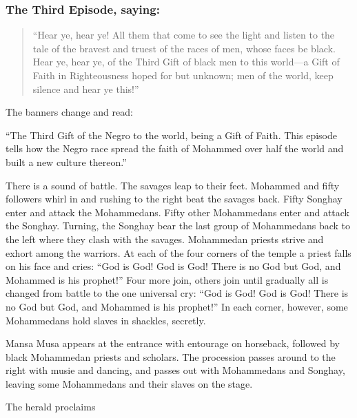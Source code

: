 \documentclass[letterpaper,10pt,english]{jupyterBook}
\begin{document}
\subsubsection{The Third Episode, saying:}
\label{\detokenize{Volumes/06/07/national_emancipation_exposition:the-third-episode-saying}}\begin{quote}

\sphinxAtStartPar
“Hear ye, hear ye! All them that come to see the light and listen to the tale of the bravest and truest of the races of men, whose faces be black. Hear ye, hear ye, of the Third Gift of black men to this world—a Gift of Faith in Righteousness hoped for but unknown; men of the world, keep silence and hear ye this!”
\end{quote}

\sphinxAtStartPar
The banners change and read:

\sphinxAtStartPar
“The Third Gift of the Negro to the world, being a Gift of Faith. This episode tells how the Negro race spread the faith of Mohammed over half the world and built a new culture thereon.”

\sphinxAtStartPar
There is a sound of battle. The savages leap to their feet. Mohammed and fifty followers whirl in and rushing to the right beat the savages back. Fifty Songhay enter and attack the Mohammedans. Fifty other Mohammedans enter and attack the Songhay. Turning, the Songhay bear the last group of Mohammedans back to the left where they clash with the savages. Mohammedan priests strive and exhort among the warriors. At each of the four corners of the temple a priest falls on his face and cries: “God is God! God is God! There is no God but God, and Mohammed is his prophet!” Four more join, others join until gradually all is changed from battle to the one universal cry: “God is God! God is God! There is no God but God, and Mohammed is his prophet!” In each corner, however, some Mohammedans hold slaves in shackles, secretly.

\sphinxAtStartPar
Mansa Musa appears at the entrance with entourage on horseback, followed by black Mohammedan priests and scholars. The procession passes around to the right with musie and dancing, and passes out with Mohammedans and Songhay, leaving some Mohammedans and their slaves on the stage.

\sphinxAtStartPar
The herald proclaims
\end{document}
